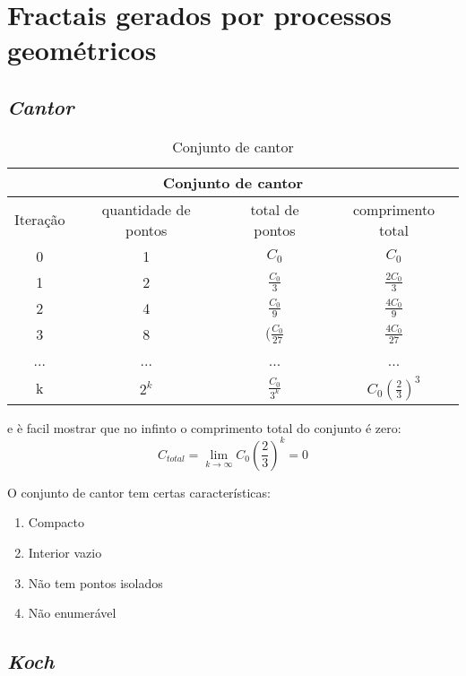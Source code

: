 \chapter{Fractais gerados por processos geométricos}
\section{\textit{Cantor}}

{\renewcommand{\arraystretch}{1.5}
\begin{table}[h]
    \centering
        \begin{tabular}{| c | c | c | c |}
             \multicolumn{4}{c}{Conjunto de cantor} \\
             \hline
             Iteração & quantidade de pontos & total de pontos & comprimento total\\
             \hline
             0 & 1 & $ C_0 $  & $ C_0 $ \\
             \hline
             1 & 2 & $ \frac{ C_0 }{3} $ & $\frac{ 2C_{0} }{ 3 }$ \\
             \hline
             2 & 4 & $ \frac{ C_{0} }{9} $ & $\frac{ 4C_0}{9}$ \\
             \hline 
             3 & 8 & $( \frac{ C_{0} }{27} $ & $\frac{ 4C_0}{27}$ \\
             \hline
             ... & ... & ... & ... \\
             \hline
             k & $2^k$ & $ \frac{ C_{0} }{3^k} $ & $ C_0(\frac{2}{3})^3 $ \\
             \hline
        \end{tabular}
    \caption{Conjunto de cantor}
    \label{tab:cantor}
\end{table}}


e è facil mostrar que no infinto o comprimento total do conjunto é zero:
\[ C_{total} = \displaystyle \lim_{k\to\infty} C_0\left( \frac{2}{3} \right)^k = 0 \]


O conjunto de cantor tem certas características:
\begin{enumerate}

\item Compacto
\item Interior vazio
\item Não tem pontos isolados
\item Não enumerável
    
\end{enumerate}

\section{\textit{Koch}}


